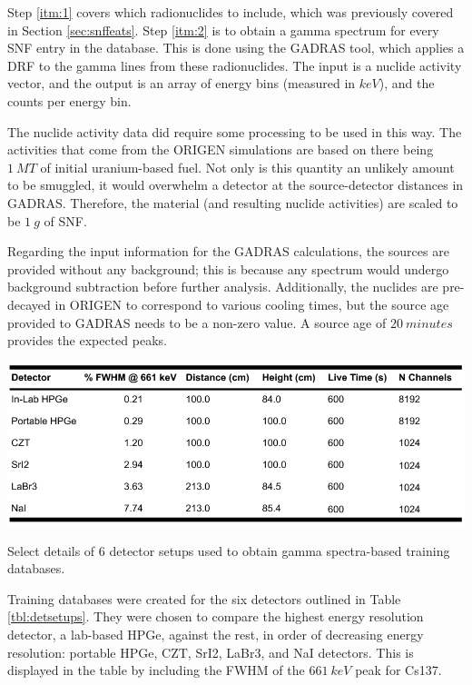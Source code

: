 Step \ref{itm:1} covers which radionuclides to include, which was previously
covered in Section \ref{sec:snffeats}. Step \ref{itm:2} is to obtain a gamma
spectrum for every \gls{SNF} entry in the database. This is done using the
\gls{GADRAS} tool, which applies a \gls{DRF} to the gamma lines from these
radionuclides. The input is a nuclide activity vector, and the output is an
array of energy bins (measured in $keV$), and the counts per energy bin.

The nuclide activity data did require some processing to be used in this way.
The activities that come from the \gls{ORIGEN} simulations are based on there
being $1\:MT$ of initial uranium-based fuel. Not only is this quantity an
unlikely amount to be smuggled, it would overwhelm a detector at the
 source-detector distances in \gls{GADRAS}. Therefore, the material (and
resulting nuclide activities) are scaled to be $1\:g$ of \gls{SNF}.

Regarding the input information for the \gls{GADRAS} calculations, the sources
are provided without any background; this is because any spectrum would undergo
background subtraction before further analysis. Additionally, the nuclides are
pre-decayed in \gls{ORIGEN} to correspond to various cooling times, but the
source age provided to \gls{GADRAS} needs to be a non-zero value. A source age
of $20\:minutes$ provides the expected peaks.

\begin{table}[!h]
  \centering
  \includegraphics[width=\linewidth]{./chapters/method/gadras_detectors.png}
  \caption{Select details of 6 detector setups used to obtain gamma 
           spectra-based training databases.}
  \label{tbl:detsetups}
\end{table}

Training databases were created for the six detectors outlined in Table
\ref{tbl:detsetups}. They were chosen to compare the highest energy resolution
detector, a lab-based \gls{HPGe}, against the rest, in order of decreasing
energy resolution: portable \gls{HPGe}, \gls{CZT}, \gls{SrI2}, \gls{LaBr3}, and
\gls{NaI} detectors. This is displayed in the table by including the \gls{FWHM}
of the $661\:keV$ peak for Cs137.

